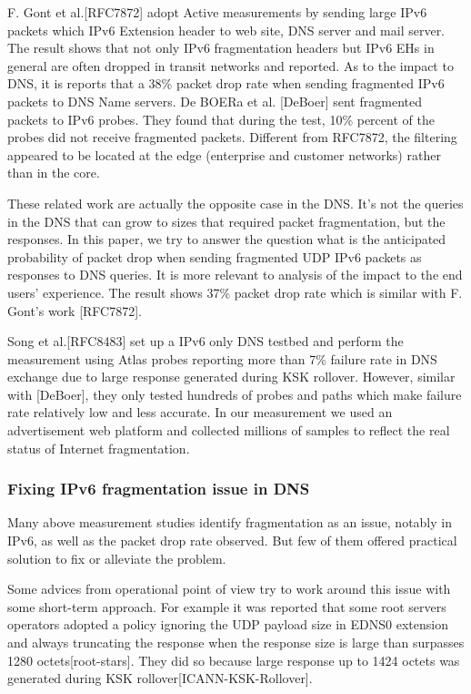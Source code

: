 F. Gont et al.[RFC7872] adopt Active measurements by sending 
large IPv6 packets which IPv6 Extension header to web site, 
DNS server and mail server. The result shows that not only 
IPv6 fragmentation headers but IPv6 EHs in general are often 
dropped in transit networks and reported. As to the 
impact to DNS, it is reports that a 38\% packet drop rate when 
sending fragmented IPv6 packets to DNS Name servers. De BOERa 
et al. [DeBoer] sent fragmented packets to IPv6 probes. 
They found that during the test, 10\% percent of the probes 
did not receive fragmented packets. Different from RFC7872, 
the filtering appeared to be located at the edge (enterprise 
and customer networks) rather than in the core. 
 
These related work are actually the opposite case in the DNS. 
It’s not the queries in the DNS that can grow to sizes that 
required packet fragmentation, but the responses. In this paper, 
we try to answer the question what is the anticipated probability 
of packet drop when sending fragmented UDP IPv6 packets as 
responses to DNS queries. It is more relevant to analysis of the 
impact to the end users' experience. The result shows 37\% packet 
drop rate which is similar with F. Gont's work [RFC7872]. 

Song et al.[RFC8483] set up a IPv6 only DNS testbed and perform the 
measurement using Atlas probes reporting more than 7\% failure rate 
in DNS exchange due to large response generated during KSK rollover. 
However, similar with [DeBoer], they only tested hundreds of probes and paths 
which make failure rate relatively low and less accurate. In our 
measurement we used an advertisement web platform and collected 
millions of samples to reflect the real status of Internet 
fragmentation. 


\subsubsection{Fixing IPv6 fragmentation issue in DNS}

Many above measurement studies identify fragmentation as an issue, 
notably in IPv6, as well as the packet drop rate observed. But few 
of them offered practical solution to fix or alleviate the problem. 

Some advices from operational point of view try to work around 
this issue with some short-term approach. For example it was reported 
that some root servers operators adopted a policy ignoring the UDP payload 
size in EDNS0 extension and always truncating the response when the 
response size is large than surpasses 1280 octets[root-stars]. They 
did so because large response up to 1424 octets was generated 
during KSK rollover[ICANN-KSK-Rollover].

